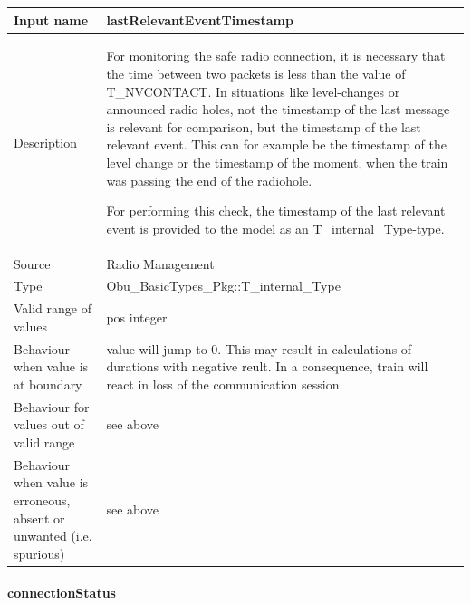 \begin{longtable}{p{}p{}}
\toprule
Input name				& lastRelevantEventTimestamp \\
\midrule
Description				& For monitoring the safe radio connection, it is necessary that the time between two packets is less than the value of {T\_NVCONTACT}.\newline
In situations like level-changes or announced radio holes, not the timestamp of the last message is relevant for comparison, but the timestamp of the last relevant event. This can for example be the timestamp of the level change or the timestamp of the moment, when the train was passing the end of the radiohole.

For performing this check, the timestamp of the last relevant event is provided to the model as an {T\_internal\_Type}-type. \\
\midrule
Source					& Radio Management \\ 
\midrule
Type					& Obu\_BasicTypes\_Pkg::T\_internal\_Type \\
\midrule
Valid range of values	& pos integer\\
\midrule
Behaviour when value is at boundary	& value will jump to 0. This may result in calculations of durations with negative reult. In a consequence, train will react in loss of the communication session.\\
\midrule
Behaviour for values out of valid range	& see above\\
\midrule
Behaviour when value is erroneous, absent or unwanted (i.e. spurious) & see above\\
\bottomrule
\end{longtable}


\paragraph{connectionStatus}

